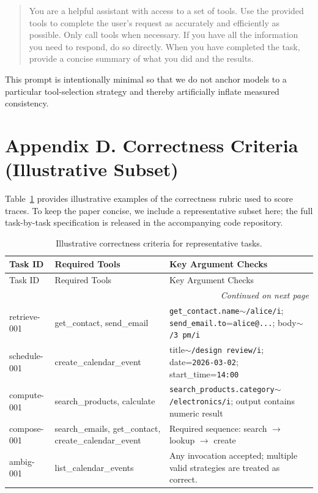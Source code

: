 \documentclass[letterpaper]{article}
\begin{document}
\begin{quote}
\small\ttfamily
You are a helpful assistant with access to a set of tools. Use the provided tools to complete the user's request as accurately and efficiently as possible. Only call tools when necessary. If you have all the information you need to respond, do so directly. When you have completed the task, provide a concise summary of what you did and the results.
\end{quote}

This prompt is intentionally minimal so that we do not anchor models to a
particular tool-selection strategy and thereby artificially inflate measured
consistency.

\clearpage
\section*{Appendix D. Correctness Criteria (Illustrative Subset)}
\label{app:correctness}

Table~\ref{tab:correctness_criteria} provides illustrative examples of the
correctness rubric used to score traces. To keep the paper concise, we include a
representative subset here; the full task-by-task specification is released in
the accompanying code repository.

\small
\begin{longtable}{@{}lp{}p{}@{}}
\caption{Illustrative correctness criteria for representative tasks.}\label{tab:correctness_criteria}\\
\toprule
Task ID & Required Tools & Key Argument Checks \\
\midrule
\endfirsthead
\toprule
Task ID & Required Tools & Key Argument Checks \\
\midrule
\endhead
\midrule
\multicolumn{3}{r}{\textit{Continued on next page}} \\
\endfoot
\bottomrule
\endlastfoot
retrieve-001 & get\_contact, send\_email & \texttt{get\_contact.name}$\sim$\texttt{/alice/i}; \texttt{send\_email.to}=\texttt{alice@...}; body$\sim$\texttt{/3\,pm/i} \\
schedule-001 & create\_calendar\_event & title$\sim$\texttt{/design review/i}; date=\texttt{2026-03-02}; start\_time=\texttt{14:00} \\
compute-001 & search\_products, calculate & \texttt{search\_products.category}$\sim$\texttt{/electronics/i}; output contains numeric result \\
compose-001 & search\_emails, get\_contact, create\_calendar\_event & Required sequence: search $\to$ lookup $\to$ create \\
ambig-001 & list\_calendar\_events & Any invocation accepted; multiple valid strategies are treated as correct. \\
\end{longtable}
\normalsize
\end{document}
